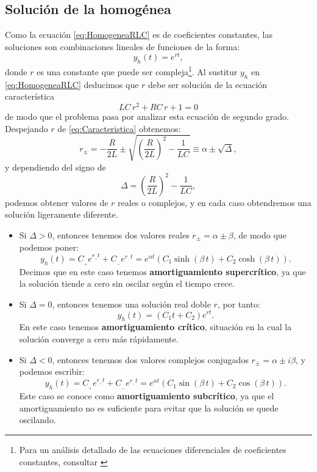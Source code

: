 \subsection{Solución de la homogénea} \label{solucionHomogenea}
Como la ecuación \eqref{eq:HomogeneaRLC} es de coeficientes constantes, las soluciones son combinaciones lineales de funciones de la forma:
\[
y_h(t) = e^{rt},
\]
donde $r$ es una constante que puede ser compleja\footnote{Para un análisis detallado de las ecuaciones diferenciales de coeficientes constantes, consultar \cite[p.~226]{DiPrima}}. Al sustitur $y_h$ en \eqref{eq:HomogeneaRLC} deducimos que $r$ debe ser solución de la ecuación característica
\begin{equation}
  \label{eq:Caracteristica}
  LC\, r^2 + RC\, r + 1 = 0
\end{equation}
de modo que el problema pasa por analizar esta ecuación de segundo grado. Despejando $r$ de \eqref{eq:Caracteristica} obtenemos:
\[
r_\pm = -\frac{R}{2L} \pm \sqrt{\left( \frac{R}{2L} \right)^2 - \frac{1}{LC}} \equiv \alpha \pm \sqrt{\Delta},
\]
y dependiendo del signo de
\[
\Delta = \left( \frac{R}{2L} \right)^2 - \frac{1}{LC},
\]
podemos obtener valores de $r$ reales o complejos, y en cada caso obtendremos una solución ligeramente diferente.
\begin{itemize}
  \item Si $\Delta > 0$, entonces tenemos dos valores reales $r_{\pm}=\alpha \pm \beta $, de modo que podemos poner:
\[
y_h(t) = C_{\!_+} e^{r_{\!_+} t} + C_{\!_-} e^{r_{\!_-}t} = e^{\alpha t}\left(C_1\sinh(\beta\, t) + C_2 \cosh(\beta\, t)\right).
\]
Decimos que en este caso tenemos \textbf{amortiguamiento supercrítico}, ya que la solución tiende a cero sin oscilar según el tiempo crece.
  \item Si $\Delta = 0$, entonces tenemos una solución real doble $r$, por tanto:
\[
y_h(t) = (C_1t+C_2) e^{rt}.
\]
En este caso tenemos \textbf{amortiguamiento crítico}, situación en la cual la solución converge a cero más rápidamente.
  \item Si $\Delta < 0$, entonces tenemos dos valores complejos conjugados $r_{\pm}=\alpha \pm i\beta$, y podemos escribir:
\[
y_h(t) = C_{\!_+} e^{r_{\!_+} t} + C_{\!_-} e^{r_{\!_-}t} = e^{\alpha t}\left(C_1\sin(\beta\, t) + C_2 \cos(\beta\, t)\right).
\]
Este caso se conoce como \textbf{amortiguamiento subcrítico}, ya que el amortiguamiento no es suficiente para evitar que la solución se quede oscilando.
\end{itemize}

